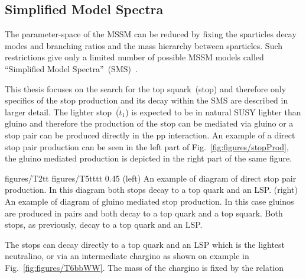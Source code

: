 
\subsection{Simplified Model Spectra}

The parameter-space of the MSSM can be reduced by fixing the sparticles decay modes and branching ratios and the mass hierarchy between sparticles. Such restrictions give only a limited number of possible MSSM models called ``Simplified Model Spectra''~(SMS)~\cite{Alves:2011wf, Alwall:2008ag, Chatrchyan:2013sza}.

This thesis focuses on the search for the top squark~(stop) and therefore only specifics of the stop production and its decay within the SMS are described in larger detail. The lighter stop~($\tilde{t}_{1}$) is expected to be in natural SUSY lighter than gluino and therefore the production of the stop can be mediated via gluino or a stop pair can be produced directly in the pp interaction. An example of a direct stop pair production can be seen in the left part of Fig.~\ref{fig:figures/stopProd}, the gluino mediated production is depicted in the right part of the same figure.


                 {figures/T2tt}
                 {figures/T5tttt} %
                 {0.45}       %
                 {(left) An example of diagram of direct stop pair production. In this diagram both stops decay to a top quark and an LSP. (right)  An example of diagram of gluino mediated stop production. In this case gluinos are produced in pairs and both decay to a top quark and a top squark. Both stops, as previously, decay to a top quark and an LSP. } %

The stops can decay directly to a top quark and an LSP which is the lightest neutralino, or via an intermediate chargino as shown on example in Fig.~\ref{fig:figures/T6bbWW}. The mass of the chargino is fixed by the relation


